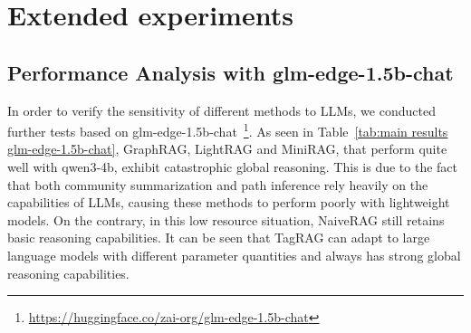 \documentclass[11pt]{article}
\begin{document}



\section{Extended experiments}


\subsection{Performance Analysis with glm-edge-1.5b-chat}

In order to verify the sensitivity of different methods to LLMs, we conducted further tests based on glm-edge-1.5b-chat~\footnote{\url{https://huggingface.co/zai-org/glm-edge-1.5b-chat}}.
As seen in Table~\ref{tab:main results glm-edge-1.5b-chat}, GraphRAG, LightRAG and MiniRAG, that perform quite well with qwen3-4b, exhibit catastrophic global reasoning.
This is due to the fact that both community summarization and path inference rely heavily on the capabilities of LLMs, causing these methods to perform poorly with lightweight models.
On the contrary, in this low resource situation, NaiveRAG still retains basic reasoning capabilities.
It can be seen that TagRAG can adapt to large language models with different parameter quantities and always has strong global reasoning capabilities.
\end{document}
